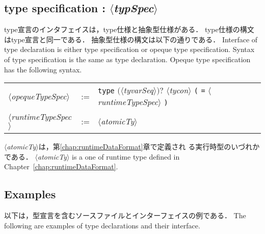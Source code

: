 \documentclass{jbook}
\newcommand{\txt}[2]{#2}
\newcommand{\nonterm}[1]{\mbox{$\langle$}{\it #1}\mbox{$\rangle$}}
\newcommand{\term}[1]{\mbox{{\tt #1}}}
\newcommand{\optional}[1]{\mbox{$($}{\protect #1}\mbox{$)?$}}
\begin{document}
\subsection{\txt{type仕様}{type specification} : \nonterm{typSpec}}
\ifjp%
	type宣言のインタフェイスは，type仕様と抽象型仕様がある．
	type仕様の構文はtype宣言と同一である．
	抽象型仕様の構文は以下の通りである．
\else%
	Interface of type declaration is either type specification or
opeque type specification.
	Syntax of type specification is the same as type declaration.
	Opeque type specification has the following syntax.
\fi%
\begin{center}
\begin{tabular}{lcll}
\nonterm{opequeTypeSpec}
  &:= & \term{type} \optional{\nonterm{tyvarSeq}} \nonterm{tycon} 
        \term{(} \term{=} \nonterm{runtimeTypeSpec} \term{)}\\
\nonterm{runtimeTypeSpec}
  &:= & \nonterm{atomicTy}
\end{tabular}
\end{center}
\ifjp%
	\nonterm{atomicTy}は，第\ref{chap:runtimeDataFormat}章で定義され
る実行時型のいづれかである．
\else%
	\nonterm{atomicTy} is a one of runtime type defined in
Chapter~\ref{chap:runtimeDataFormat}.
\fi%

\subsection{\txt{型宣言とインタフェイスの例}{Examples}}
\ifjp%
	以下は，型宣言を含むソースファイルとインターフェイスの例である．
\else%
	The following are examples of type declarations and their interface.
\fi%
\end{document}
